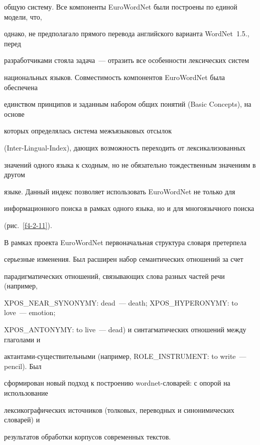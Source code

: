 общую систему. Все компоненты EuroWordNet были построены по единой модели, что, 


однако, не предполагало прямого перевода английского варианта WordNet~1.5., перед 


разработчиками стояла задача~--- отразить все особенности лексических систем 


национальных языков. Со\-вмес\-ти\-мость компонентов EuroWordNet была обеспечена 


единством принципов и заданным набором общих понятий (Basic Concepts), на основе 


которых определялась система межъязыковых отсылок 


      (Inter-Lingual-Index), дающих возможность переходить от лексикализованных 


значений одного языка к сходным, но не обязательно тож\-де\-ст\-вен\-ным значениям в другом 


языке. Данный индекс позволяет использовать EuroWordNet не только для 


информационного поиска в рамках одного языка, но и для многоязычного поиска 


(рис.~\ref{f4-2-11}).


      





      


      В рамках проекта EuroWordNet первоначальная структура словаря претерпела 


серьезные изменения. Был расширен набор семантических отношений за счет 


парадигматических отношений, связывающих слова разных частей речи (например, 


XPOS\_NEAR\_SYNONYMY: dead~--- death; XPOS\_HYPERONYMY: to love~--- emotion; 


XPOS\_ANTONYMY: to live~--- dead) и синтагматических отношений между глаголами и 


актантами-существительными (например, ROLE\_INSTRUMENT: to write~--- pencil). Был 


сформирован новый подход к построению wordnet-словарей: с опорой на использование 


лексикографических источников (толковых, переводных и синонимических словарей) и 


результатов обработки корпусов современных текстов. 



